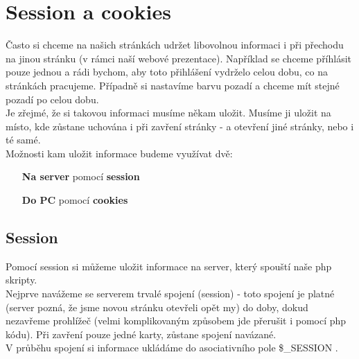 \section{Session a cookies}
Často si chceme na našich stránkách udržet libovolnou informaci i při přechodu na jinou stránku (v rámci naší webové prezentace). Například se chceme příhlásit pouze jednou a rádi bychom, aby toto přihlášení vydrželo celou dobu, co na stránkách pracujeme. Případně si nastavíme barvu pozadí a chceme mít stejné pozadí po celou dobu.\\
Je zřejmé, že si takovou informaci musíme někam uložit. Musíme ji uložit na místo, kde zůstane uchována i při zavření stránky - a otevření jiné stránky, nebo i té samé.\\
Možnosti kam uložit informace budeme využívat dvě:
\begin{enumerate}
\item[\textbf{Na server}] pomocí \textbf{session} 
\item[\textbf{Do PC}] pomocí \textbf{cookies}
\end{enumerate}

\subsection{Session}
Pomocí session si můžeme uložit informace na server, který spouští naše php skripty.\\
Nejprve navážeme se serverem trvalé spojení (session) - toto spojení je platné (server pozná, že jsme novou stránku otevřeli opět my) do doby, dokud nezavřeme prohlížeč (velmi komplikovaným způsobem jde přerušit i pomocí php kódu). Při zavření pouze jedné karty, zůstane spojení navázané.\\
\vspace{0.5cm}
V průběhu spojení si informace ukládáme do asociativního pole \$\_SESSION .   

